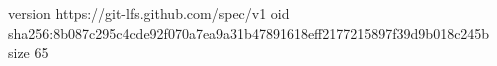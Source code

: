 version https://git-lfs.github.com/spec/v1
oid sha256:8b087c295c4cde92f070a7ea9a31b47891618eff2177215897f39d9b018c245b
size 65
